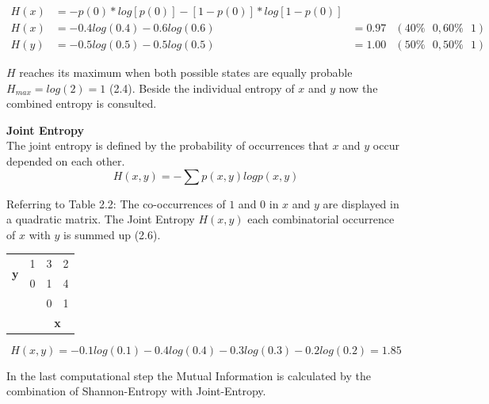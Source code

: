 \begin{align}
H(x) & = -p(0)*log[p(0)]-[1-p(0)]*log[1-p(0)]\\
H(x) & = -0.4log(0.4)-0.6log(0.6) & = 0.97 & (40\% \text{ }0, 60\% \text{ }1)\\
H(y) & = -0.5log(0.5)-0.5log(0.5) & = 1.00 & (50\% \text{ }0, 50\% \text{ }1)
\end{align}

$H$ reaches its maximum when both possible states are equally probable $H_{max}=log(2)=1$ (2.4). Beside the individual entropy of $x$ and $y$ now the combined entropy is consulted.

\begin{defn}\textbf{Joint Entropy}\\
The joint entropy is defined by the probability of occurrences that $x$ and $y$ occur depended on each other.
\begin{equation}
H(x,y)=-\sum p(x,y)log p(x,y)
\end{equation}
\end{defn}
\begin{exmp}
Referring to Table 2.2: The co-occurrences of $1$ and $0$ in $x$ and $y$ are displayed in a quadratic matrix. The Joint Entropy $H(x,y)$ each combinatorial occurrence of $x$ with $y$ is summed up (2.6).
\end{exmp}
\begin{center}
\begin{tabular}{llll}
\cline{3-4}
\multicolumn{1}{c}{\multirow{2}{*}{\textbf{y}}} & \multicolumn{1}{l|}{1} & \multicolumn{1}{l|}{3} & \multicolumn{1}{l|}{2} \\ \cline{3-4} 
\multicolumn{1}{c}{}                            & \multicolumn{1}{l|}{0} & \multicolumn{1}{l|}{1} & \multicolumn{1}{l|}{4} \\ \cline{3-4} 
                                                &                        & 0                      & 1                      \\
                                                &                        & \multicolumn{2}{c}{\textbf{x}}                 
\end{tabular}
\end{center}

\begin{equation}
H(x,y)= -0.1log(0.1) - 0.4 log (0.4) - 0.3 log (0.3) - 0.2 log (0.2) = 1.85
\end{equation}

In the last computational step the Mutual Information is calculated by the combination of Shannon-Entropy with Joint-Entropy.

